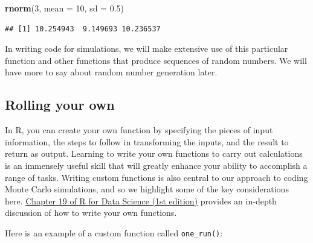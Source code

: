 \documentclass[
]{book}
\newenvironment{Shaded}{\begin{snugshade}}{\end{snugshade}}
\newcommand{\AttributeTok}[1]{\textcolor[rgb]{0.13,0.29,0.53}{#1}}
\newcommand{\ControlFlowTok}[1]{\textcolor[rgb]{0.13,0.29,0.53}{\textbf{#1}}}
\newcommand{\DecValTok}[1]{\textcolor[rgb]{0.00,0.00,0.81}{#1}}
\newcommand{\FloatTok}[1]{\textcolor[rgb]{0.00,0.00,0.81}{#1}}
\newcommand{\FunctionTok}[1]{\textcolor[rgb]{0.13,0.29,0.53}{\textbf{#1}}}
\newcommand{\NormalTok}[1]{#1}
\newcommand{\OtherTok}[1]{\textcolor[rgb]{0.56,0.35,0.01}{#1}}
\newcommand{\SpecialCharTok}[1]{\textcolor[rgb]{0.81,0.36,0.00}{\textbf{#1}}}
\begin{document}
\begin{Shaded}
\begin{Highlighting}[]
\FunctionTok{rnorm}\NormalTok{(}\DecValTok{3}\NormalTok{, }\AttributeTok{mean =} \DecValTok{10}\NormalTok{, }\AttributeTok{sd =} \FloatTok{0.5}\NormalTok{)}
\end{Highlighting}
\end{Shaded}

\begin{verbatim}
## [1] 10.254943  9.149693 10.236537
\end{verbatim}

In writing code for simulations, we will make extensive use of this particular function and other functions that produce sequences of random numbers.
We will have more to say about random number generation later.

\subsection{Rolling your own}\label{rolling-your-own}

In R, you can create your own function by specifying the pieces of input information, the steps to follow in transforming the inputs, and the result to return as output.
Learning to write your own functions to carry out calculations is an immensely useful skill that will greatly enhance your ability to accomplish a range of tasks.
Writing custom functions is also central to our approach to coding Monte Carlo simulations, and so we highlight some of the key considerations here.
\href{https://r4ds.had.co.nz/functions.html}{Chapter 19 of R for Data Science (1st edition)} provides an in-depth discussion of how to write your own functions.

Here is an example of a custom function called \texttt{one\_run()}:

\begin{Shaded}
\end{Shaded}
\end{document}
